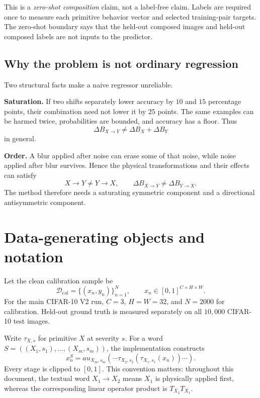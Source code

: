 \documentclass[11pt,a4paper]{article}
\newcommand{\dB}{\Delta B}
\begin{document}
This is a \emph{zero-shot composition} claim, not a label-free claim.  Labels
are required once to measure each primitive behavior vector and selected
training-pair targets.  The zero-shot boundary says that the held-out composed
images and held-out composed labels are not inputs to the predictor.

\subsection{Why the problem is not ordinary regression}

Two structural facts make a naive regressor unreliable.

\textbf{Saturation.} If two shifts separately lower accuracy by $10$ and $15$
percentage points, their combination need not lower it by $25$ points.  The
same examples can be harmed twice, probabilities are bounded, and accuracy has
a floor.  Thus
\[
\dB_{X\to Y}\neq \dB_X+\dB_Y
\]
in general.

\textbf{Order.} A blur applied after noise can erase some of that noise, while
noise applied after blur survives.  Hence the physical transformations and
their effects can satisfy
\[
X\to Y\neq Y\to X,
\qquad
\dB_{X\to Y}\neq \dB_{Y\to X}.
\]
The method therefore needs a saturating symmetric component and a directional
antisymmetric component.

\section{Data-generating objects and notation}

Let the clean calibration sample be
\[
\mathcal{D}_{\mathrm{cal}}=\{(x_n,y_n)\}_{n=1}^{N},
\qquad x_n\in[0,1]^{C\times H\times W}.
\]
For the main CIFAR-10 V2 run, $C=3$, $H=W=32$, and $N=2000$ for calibration.
Held-out ground truth is measured separately on all $10{,}000$ CIFAR-10 test
images.

Write $\tau_{X,s}$ for primitive $X$ at severity $s$.  For a word
$S=((X_1,s_1),\ldots,(X_m,s_m))$, the implementation constructs
\begin{equation}
x_n^S=	au_{X_m,s_m}\!\left(\cdots
\tau_{X_2,s_2}(\tau_{X_1,s_1}(x_n))\cdots\right).
\label{eq:imageword}
\end{equation}
Every stage is clipped to $[0,1]$.  This convention matters: throughout this
document, the textual word $X_1\to X_2$ means $X_1$ is physically applied
first, whereas the corresponding linear operator product is $T_{X_2}T_{X_1}$.
\end{document}

